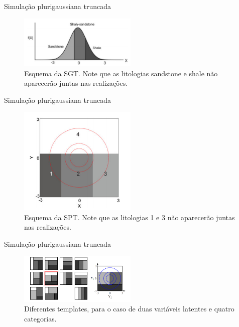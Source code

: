 \documentclass[aspectratio=169]{beamer}
\begin{document}
\begin{frame}{Simulação plurigaussiana truncada}
	\begin{figure}[H]
		\caption{\label{trunc_gauss}Esquema da SGT. Note que as litologias sandstone e shale não aparecerão juntas nas realizações.}
		\begin{center}
			\includegraphics[width=0.5\textwidth]{capitulo_3/gauss_trunc_sketch.png}
		\end{center}
	\end{figure}
\end{frame}

\begin{frame}{Simulação plurigaussiana truncada}
\begin{figure}[H]
	\caption{\label{trunc_pluri}Esquema da SPT. Note que as litologias 1 e 3 não aparecerão juntas nas realizações.}
	\begin{center}
		\includegraphics[width=0.5\textwidth]{capitulo_3/pluri_sketch.png}
	\end{center}
\end{figure}
\end{frame}

\begin{frame}{Simulação plurigaussiana truncada}
	\begin{figure}[H]
		\caption{\label{trunc_rules}Diferentes templates, para o caso de duas variáveis latentes e quatro categorias.}
		\begin{center}
			\includegraphics[width=0.5\textwidth]{capitulo_3/trunc_rules.png}
		\end{center}
	\end{figure}
\end{frame}
\end{document}

